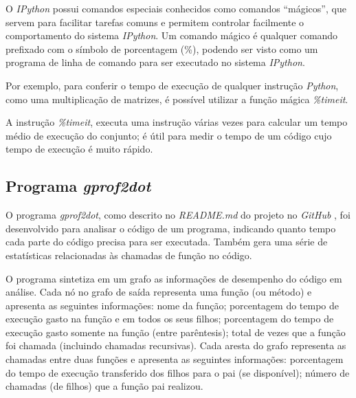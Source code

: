 \documentclass[12pt]{article}
\newcommand{\aspas}[1]{``#1''} %
\begin{document}
O \textit{IPython} possui comandos especiais conhecidos como comandos \aspas{mágicos}, que servem para facilitar tarefas comuns e permitem controlar facilmente o comportamento do sistema \textit{IPython}. Um comando mágico é qualquer comando prefixado com o símbolo de porcentagem (\%), podendo ser visto como um programa de linha de comando para ser executado no sistema \textit{IPython}.

Por exemplo, para conferir o tempo de execução de qualquer instrução \textit{Python}, como uma multiplicação de matrizes, é possível utilizar a função mágica \textit{\%timeit}.

A instrução \textit{\%timeit}, executa uma instrução várias vezes para calcular um tempo médio de execução do conjunto; é útil para medir o tempo de um código cujo tempo de execução é muito rápido. 

\subsection{Programa \textit{gprof2dot}}


O programa \textit{gprof2dot}, como descrito no \textit{README.md} do projeto no \textit{GitHub} \cite{fonseca:2022}, foi desenvolvido para analisar o código de um programa, indicando quanto tempo cada parte do código precisa para ser executada. Também gera uma série de estatísticas relacionadas às chamadas de função no código.

O programa sintetiza em um grafo as informações de desempenho do código em análise. Cada nó no grafo de saída representa uma função (ou método) e apresenta as seguintes informações: nome da função; porcentagem do tempo de execução gasto na função e em todos os seus filhos; porcentagem do tempo de execução gasto somente na função (entre parêntesis); total de vezes que a função foi chamada (incluindo chamadas recursivas). Cada aresta do grafo representa as chamadas entre duas funções e apresenta as seguintes informações: porcentagem do tempo de execução transferido dos filhos para o pai (se disponível); número de chamadas (de filhos) que a função pai realizou.
\end{document}
